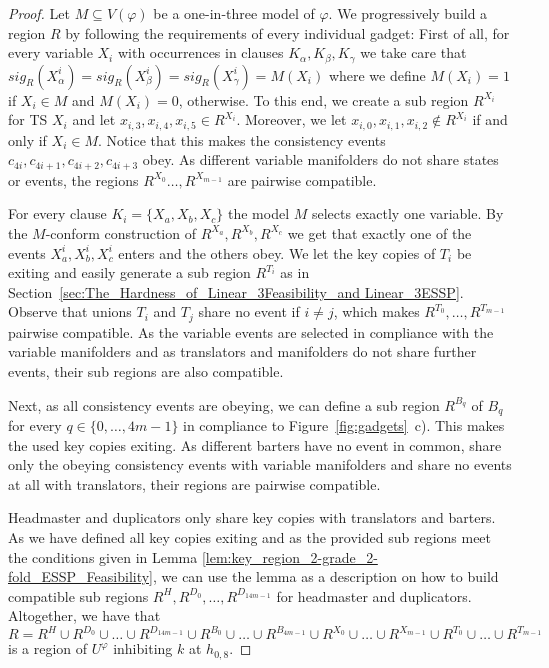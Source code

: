 \documentclass[english]{lipics_hacked}
\begin{document}
\begin{proof}
Let $M \subseteq V(\varphi)$ be a one-in-three model of $\varphi$.
We progressively build a region $R$ by following the requirements of every individual gadget:
First of all, for every variable $X_i$ with occurrences in clauses $K_\alpha, K_\beta, K_\gamma$ we take care that $sig_R(X^i_\alpha) = sig_R(X^i_\beta) = sig_R(X^i_\gamma) = M(X_i)$ where we define $M(X_i) = 1$ if $X_i \in M$ and $M(X_i) = 0$, otherwise.
To this end, we create a sub region $R^{X_i}$ for TS $X_i$ and let $x_{i,3}, x_{i,4}, x_{i,5} \in R^{X_i}$.
Moreover, we let $x_{i,0}, x_{i,1}, x_{i,2} \not\in R^{X_i}$ if and only if $X_i \in M$.
Notice that this makes the consistency events $c_{4i}, c_{4i+1}, c_{4i+2}, c_{4i+3}$ obey.
As different variable manifolders do not share states or events, the regions $R^{X_0}\dots,R^{X_{m-1}}$ are pairwise compatible.

For every clause $K_i = \{X_a, X_b, X_c\}$ the model $M$ selects exactly one variable.
By the $M$-conform construction of $R^{X_a}, R^{X_b}, R^{X_c}$ we get that exactly one of the events $X^i_a, X^i_b, X^i_c$ enters and the others obey.
We let the key copies of $T_i$ be exiting and easily generate a sub region $R^{T_i}$ as in Section~\ref{sec:The_Hardness_of_Linear_3Feasibility_and Linear_3ESSP}.
Observe that unions $T_i$ and $T_j$ share no event if $i\not=j$, which makes $R^{T_0},\ldots,R^{T_{m-1}}$ pairwise compatible.
As the variable events are selected in compliance with the variable manifolders and as translators and manifolders do not share further events, their sub regions are also compatible.

Next, as all consistency events are obeying, we can define a sub region $R^{B_q}$ of $B_q$ for every $q\in \{0,\dots,4m-1\}$ in compliance to Figure~\ref{fig:gadgets}~c).
This makes the used key copies exiting.
As different barters have no event in common, share only the obeying consistency events with variable manifolders and share no events at all with translators, their regions are pairwise compatible.

Headmaster and duplicators only share key copies with translators and barters.
As we have defined all key copies exiting and as the provided sub regions meet the conditions given in Lemma \ref{lem:key_region_2-grade_2-fold_ESSP_Feasibility}, we can use the lemma as a description on how to build compatible sub regions $R^{H}, R^{D_0}, \dots, R^{D_{14m-1}}$ for headmaster and duplicators.
Altogether, we have that 
\[
R=R^{H} \cup R^{D_0} \cup \dots \cup R^{D_{14m-1}} \cup R^{B_0} \cup \dots \cup R^{B_{4m-1}} \cup R^{X_0} \cup \dots \cup R^{X_{m-1}} \cup R^{T_0} \cup\dots \cup R^{T_{m-1}}
\]
is a region of $U^\varphi$ inhibiting $k$ at $h_{0,8}$.
\end{proof}
\end{document}

